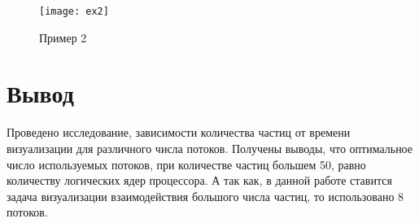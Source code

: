 \begin{figure}[H]
	\centering
	\texttt{[image: ex2]}
	\caption{Пример 2}
	\label{img:ex2}
\end{figure}

\section{\textbf{Вывод}}

Проведено исследование, зависимости количества частиц от времени визуализации для различного числа потоков. Получены выводы, что оптимальное число используемых потоков, при количестве частиц большем 50, равно количеству логических ядер процессора. А так как, в данной работе ставится задача визуализации взаимодействия большого числа частиц, то использовано 8 потоков. 